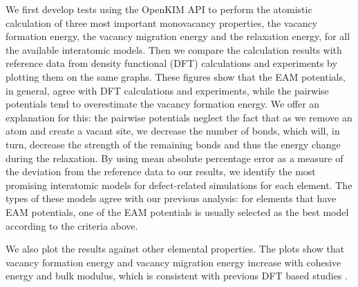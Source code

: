 \documentclass[%
 reprint,
 amsmath,amssymb,
 aps,
]{revtex4-1}
\begin{document}
We first develop tests using the OpenKIM API to perform the atomistic calculation of three most important monovacancy properties, the vacancy formation energy, the vacancy migration energy and the relaxation energy, for all the available interatomic models.
Then we compare the calculation results with reference data from density functional (DFT) calculations and experiments by plotting them on the same graphs.
These figures show that the EAM potentials, in general, agree with DFT calculations and experiments, while the pairwise potentials tend to overestimate the vacancy formation energy.
We offer an explanation for this: the pairwise potentials neglect the fact that as we remove an atom and create a vacant site, we decrease the number of bonds, which will, in turn, decrease the strength of the remaining bonds and thus the energy change during the relaxation.
By using mean absolute percentage error as a measure of the deviation from the reference data to our results, we identify the most promising interatomic models for defect-related simulations for each element.
The types of these models agree with our previous analysis: for elements that have EAM potentials, one of the EAM potentials is usually selected as the best model according to the criteria above.

We also plot the results against other elemental properties.
The plots show that vacancy formation energy and vacancy migration energy increase with cohesive energy and bulk modulus, which is consistent with previous DFT based studies \cite{angsten2014elemental}.
%
%
%
%
%
\end{document}
